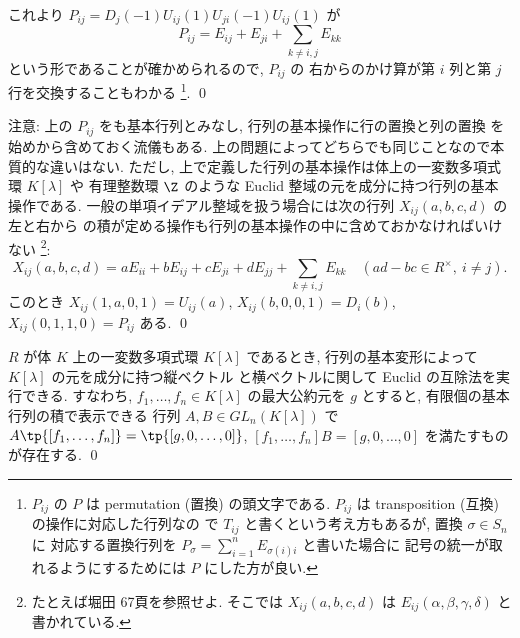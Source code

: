 \documentclass[12pt,twoside]{jarticle}
\begin{document}
これより $P_{ij}=D_j(-1)U_{ij}(1)U_{ji}(-1)U_{ij}(1)$ が
\begin{equation*}
  P_{ij}=E_{ij}+E_{ji}+\sum_{k\ne i,j}E_{kk}  
\end{equation*}
という形であることが確かめられるので, $P_{ij}$ の
右からのかけ算が第 $i$ 列と第 $j$ 行を交換することもわかる%
\footnote{$P_{ij}$ の $P$ は permutation (置換) の頭文字である.
  $P_{ij}$ は transposition (互換) の操作に対応した行列なの
  で $T_{ij}$ と書くという考え方もあるが, 置換 $\sigma\in S_n$ に
  対応する置換行列を $P_\sigma=\sum_{i=1}^n E_{\sigma(i)i}$ と書いた場合に
  記号の統一が取れるようにするためには $P$ にした方が良い.}.
\qed

\medskip
\noindent
注意: 上の $P_{ij}$ をも基本行列とみなし, 行列の基本操作に行の置換と列の置換
を始めから含めておく流儀もある.  上の問題によってどちらでも同じことなので本
質的な違いはない. 
ただし, 上で定義した行列の基本操作は体上の一変数多項式環 $K[\lambda]$ や
有理整数環 $\Z$ のような Euclid 整域の元を成分に持つ行列の基本操作である.
一般の単項イデアル整域を扱う場合には次の行列 $X_{ij}(a,b,c,d)$ の左と右から
の積が定める操作も行列の基本操作の中に含めておかなければいけない%
\footnote{たとえば堀田 \cite{gun-kagun} 67頁を参照せよ.  
  そこでは $X_{ij}(a,b,c,d)$ は $E_{ij}(\alpha,\beta,\gamma,\delta)$ と
  書かれている.}:
\begin{equation*}
  X_{ij}(a,b,c,d) 
  = a E_{ii} + b E_{ij} + c E_{ji} + d E_{jj} + \sum_{k\ne i,j} E_{kk}
  \quad
  (ad-bc\in R^{\times},\ i\ne j).
\end{equation*}
このとき $X_{ij}(1,a,0,1) = U_{ij}(a)$, $X_{ij}(b,0,0,1) = D_i(b)$,
$X_{ij}(0,1,1,0) = P_{ij}$ ある.
\qed


\begin{question}
\label{q:elem-transf-Euclid}
  $R$ が体 $K$ 上の一変数多項式環 $K[\lambda]$ であるとき, 
  行列の基本変形によって $K[\lambda]$ の元を成分に持つ縦ベクトル
  と横ベクトルに関して Euclid の互除法を実行できる. 
  すなわち, $f_1,\dots,f_n\in K[\lambda]$ の最大公約元を $g$ とすると, 
  有限個の基本行列の積で表示できる
  行列 $A,B\in GL_n(K[\lambda])$ 
  で $A\tp{[f_1,\dots,f_n]}=\tp{[g,0,\dots,0]}$,  
  $[f_1,\dots,f_n]B=[g,0,\dots,0]$ を満たすものが存在する.
  \qed
\end{question}
\end{document}

